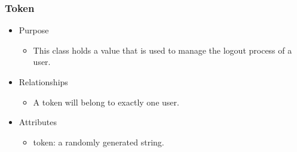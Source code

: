 \documentclass[hidelinks, 12pt, a4paper]{article}
\begin{document}
\begin{itemize}
    \subsubsection{Token}
    \begin{itemize}
        \item Purpose
        \begin{itemize}
            \item This class holds a value that is used to manage the logout process of a user.
        \end{itemize}
        \item Relationships
        \begin{itemize}
            \item A token will belong to exactly one user.
        \end{itemize}
        \item Attributes
        \begin{itemize}
            \item token: a randomly generated string.
        \end{itemize}
    \end{itemize}


\end{itemize}
\end{document}
